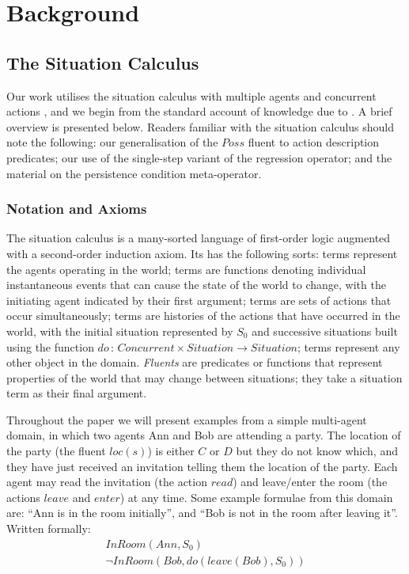 


\chapter{Background}

\label{ch:background}


\section{The Situation Calculus}

Our work utilises the situation calculus \cite{pirri99contributions_sitcalc}
with multiple agents \cite{shapiro98specifying_ma_systems} and concurrent
actions \cite{reiter96sc_nat_conc}, and we begin from the standard
account of knowledge due to \cite{scherl03sc_knowledge}. A brief
overview is presented below. Readers familiar with the situation calculus
should note the following: our generalisation of the $Poss$ fluent
to action description predicates; our use of the single-step variant
of the regression operator; and the material on the persistence condition
meta-operator.


\subsection{Notation and Axioms\label{sub:Notation-and-Axioms}}

The situation calculus is a many-sorted language of first-order logic
augmented with a second-order induction axiom. Its has the following
sorts:  terms represent the agents operating in the world;
\emph{} terms are functions denoting individual instantaneous
events that can cause the state of the world to change, with the initiating
agent indicated by their first argument;  terms are
sets of actions that occur simultaneously;  terms
are histories of the actions that have occurred in the world, with
the initial situation represented by $S_{0}$ and successive situations
built using the function $do\,:\, Concurrent\times Situation\rightarrow Situation$;
 terms represent any other object in the domain. \emph{Fluents}
are predicates or functions that represent properties of the world
that may change between situations; they take a situation term as
their final argument.

Throughout the paper we will present examples from a simple multi-agent
domain, in which two agents Ann and Bob are attending a party. The
location of the party (the fluent $loc(s)$) is either $C$ or $D$
but they do not know which, and they have just received an invitation
telling them the location of the party. Each agent may read the invitation
(the action $read$) and leave/enter the room (the actions $leave$
and $enter$) at any time. Some example formulae from this domain
are: {}``Ann is in the room initially'', and {}``Bob is not in
the room after leaving it''. Written formally:\begin{gather*}
InRoom(Ann,S_{0})\\
\neg InRoom(Bob,do(leave(Bob),S_{0}))\end{gather*}


